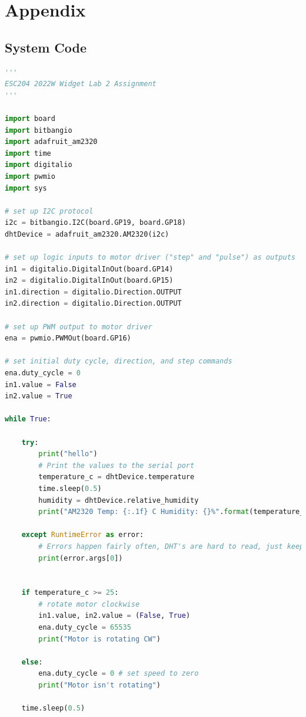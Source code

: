 \documentclass[11pt]{article}
\begin{document}
\newpage







\section{Appendix}

\subsection{System Code} \label{code}
\begin{lstlisting}[language=Python, caption=Python code for the widget]
'''
ESC204 2022W Widget Lab 2 Assignment
'''

import board
import bitbangio
import adafruit_am2320
import time
import digitalio
import pwmio
import sys

# set up I2C protocol
i2c = bitbangio.I2C(board.GP19, board.GP18)
dhtDevice = adafruit_am2320.AM2320(i2c)

# set up logic inputs to motor driver ("step" and "pulse") as outputs
in1 = digitalio.DigitalInOut(board.GP14)
in2 = digitalio.DigitalInOut(board.GP15)
in1.direction = digitalio.Direction.OUTPUT
in2.direction = digitalio.Direction.OUTPUT

# set up PWM output to motor driver
ena = pwmio.PWMOut(board.GP16)

# set initial duty cycle, direction, and step commands
ena.duty_cycle = 0
in1.value = False
in2.value = True

while True:

    try:
        print("hello")
        # Print the values to the serial port
        temperature_c = dhtDevice.temperature
        time.sleep(0.5)
        humidity = dhtDevice.relative_humidity
        print("AM2320 Temp: {:.1f} C Humidity: {}%".format(temperature_c,humidity))

    except RuntimeError as error:
        # Errors happen fairly often, DHT's are hard to read, just keep trying to run/power cycle Pico
        print(error.args[0])


    if temperature_c >= 25:
        # rotate motor clockwise
        in1.value, in2.value = (False, True)
        ena.duty_cycle = 65535
        print("Motor is rotating CW")

    else:
        ena.duty_cycle = 0 # set speed to zero
        print("Motor isn't rotating")

    time.sleep(0.5)
\end{lstlisting}
\end{document}
